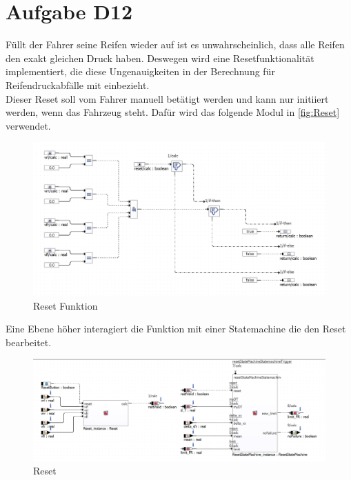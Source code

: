 
\chapter{Aufgabe D12}
Füllt der Fahrer seine Reifen wieder auf ist es unwahrscheinlich, dass alle Reifen den exakt gleichen Druck haben. Deswegen wird eine Resetfunktionalität implementiert, die diese Ungenauigkeiten in der Berechnung für Reifendruckabfälle mit einbezieht.\\ 
Dieser Reset soll vom Fahrer manuell betätigt werden und kann nur initiiert werden, wenn das Fahrzeug steht. Dafür wird das folgende Modul in \autoref{fig:Reset} verwendet.
\begin{figure}[H]
	\centering
	\includegraphics[width=0.9\linewidth]{../Graphiken/Reset.png}
	\caption{Reset Funktion}
	\label{fig:Reset}
\end{figure}
Eine Ebene höher interagiert die Funktion mit einer Statemachine die den Reset bearbeitet.
 \begin{figure}[H]
 	\centering
 	\includegraphics[width=\linewidth]{../Graphiken/ResetTop1.png}
 	\caption{Reset}
 	\label{fig:ResetTop}
 \end{figure}

